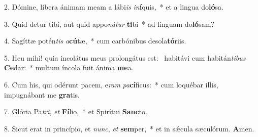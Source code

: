 2. Dómine, líbera ánimam meam a lábi\textit{is} \textit{in}\textbf{í}quis,~*  et a lingua do\textbf{ló}sa.\

3. Quid detur tibi, aut quid appo\textit{ná}\textit{tur} \textbf{ti}bi~*  ad linguam do\textbf{ló}sam?\

4. Sagíttæ potén\textit{tis} \textit{a}\textbf{cú}tæ,~*  cum carbónibus desola\textbf{tó}riis.\

5. Heu mihi! quia incolátus meus prolongátus est: \dag\  habitávi cum habitán\textit{ti}\textit{bus} \textbf{Ce}dar:~*  multum íncola fuit ánima \textbf{me}a.\

6. Cum his, qui odérunt pacem, e\textit{ram} \textit{pa}\textbf{cí}ficus:~*  cum loquébar illis, impugnábant me \textbf{gra}tis.\

7. Glória Pa\textit{tri}, \textit{et} \textbf{Fí}lio,~*  et Spirítui \textbf{Sanc}to.\

8. Sicut erat in princípio, et \textit{nunc}, \textit{et} \textbf{sem}per,~*  et in sǽcula sæculórum. \textbf{A}men.\

